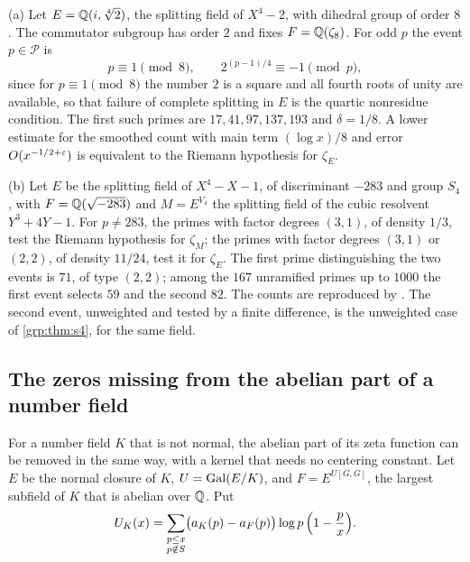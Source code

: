 \begin{example}\label{nab:ex:nonsplit}
(a) Let $E=\mathbb{Q}(i,\sqrt[4]2)$, the splitting field of $X^4-2$, with dihedral group of order
$8$. The commutator subgroup has order $2$ and fixes $F=\mathbb{Q}(\zeta_8)$. For odd $p$ the event
$p\in\mathcal P$ is
\[
 p\equiv1\pmod 8,\qquad 2^{(p-1)/4}\equiv-1\pmod p,
\]
since for $p\equiv1\pmod8$ the number $2$ is a square and all fourth roots of unity are
available, so that failure of complete splitting in $E$ is the quartic nonresidue
condition. The first such primes are $17,41,97,137,193$ and $\delta=1/8$. A lower estimate
for the smoothed count with main term $(\log x)/8$ and error $O(x^{-1/2+\varepsilon})$ is
equivalent to the Riemann hypothesis for $\zeta_E$.

(b) Let $E$ be the splitting field of $X^4-X-1$, of discriminant $-283$ and group $S_4$,
with $F=\mathbb{Q}(\sqrt{-283})$ and $M=E^{V_4}$ the splitting field of the cubic resolvent
$Y^3+4Y-1$. For $p\ne283$, the primes with factor degrees $(3,1)$, of density $1/3$, test
the Riemann hypothesis for $\zeta_M$; the primes with factor degrees $(3,1)$ or $(2,2)$, of
density $11/24$, test it for $\zeta_E$. The first prime distinguishing the two events is
$71$, of type $(2,2)$; among the $167$ unramified primes up to $1000$ the first event
selects $59$ and the second $82$. The counts are reproduced by
. The second
event, unweighted and tested by a finite difference, is the unweighted case of
\cref{grp:thm:s4}, for the same field.
\end{example}

\subsection{The zeros missing from the abelian part of a number field}\label{nab:sec:missing}
\begingroup\raggedright
{}
\endgroup

For a number field $K$ that is not normal, the abelian part of its zeta function can be
removed in the same way, with a kernel that needs no centering constant. Let $E$ be the
normal closure of $K$, $U=\operatorname{Gal}(E/K)$, and $F=E^{U[G,G]}$, the largest subfield of $K$ that
is abelian over $\mathbb{Q}$. Put
\[
 U_K(x)=\sum_{\substack{p\le x\\p\notin S}}\bigl(a_K(p)-a_F(p)\bigr)\log p\,\Bigl(1-\frac px\Bigr).
\]

